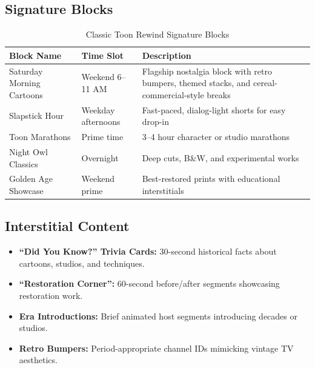 \documentclass[12pt,letterpaper,twoside]{report}
\begin{document}
\subsection{Signature Blocks}

\begin{table}[H]
\centering
\caption{Classic Toon Rewind Signature Blocks}
\label{tab:classic-blocks}
\begin{tabular}{@{}L{4cm}L{2.5cm}L{7cm}@{}}
\toprule
\textbf{Block Name} & \textbf{Time Slot} & \textbf{Description} \\
\midrule
Saturday Morning Cartoons & Weekend 6--11 AM & Flagship nostalgia block with retro bumpers, themed stacks, and cereal-commercial-style breaks \\
\addlinespace
Slapstick Hour & Weekday afternoons & Fast-paced, dialog-light shorts for easy drop-in \\
\addlinespace
Toon Marathons & Prime time & 3--4 hour character or studio marathons \\
\addlinespace
Night Owl Classics & Overnight & Deep cuts, B\&W, and experimental works \\
\addlinespace
Golden Age Showcase & Weekend prime & Best-restored prints with educational interstitials \\
\bottomrule
\end{tabular}
\end{table}

\subsection{Interstitial Content}

\begin{itemize}[leftmargin=1.5cm]
    \item \textbf{``Did You Know?'' Trivia Cards:} 30-second historical facts about cartoons, studios, and techniques.
    \item \textbf{``Restoration Corner'':} 60-second before/after segments showcasing restoration work.
    \item \textbf{Era Introductions:} Brief animated host segments introducing decades or studios.
    \item \textbf{Retro Bumpers:} Period-appropriate channel IDs mimicking vintage TV aesthetics.
\end{itemize}

\end{document}
